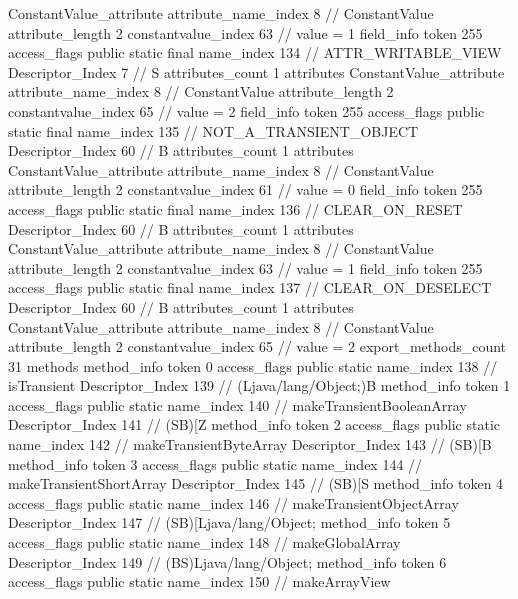 {{{{{{				ConstantValue_attribute {
					attribute_name_index	8		// ConstantValue
					attribute_length	2
					constantvalue_index	63		// value = 1
				}
				}
			}
			field_info {
				token	255
				access_flags	public static final
				name_index	134		// ATTR_WRITABLE_VIEW
				Descriptor_Index	7		// S
				attributes_count	1
				attributes {
				ConstantValue_attribute {
					attribute_name_index	8		// ConstantValue
					attribute_length	2
					constantvalue_index	65		// value = 2
				}
				}
			}
			field_info {
				token	255
				access_flags	public static final
				name_index	135		// NOT_A_TRANSIENT_OBJECT
				Descriptor_Index	60		// B
				attributes_count	1
				attributes {
				ConstantValue_attribute {
					attribute_name_index	8		// ConstantValue
					attribute_length	2
					constantvalue_index	61		// value = 0
				}
				}
			}
			field_info {
				token	255
				access_flags	public static final
				name_index	136		// CLEAR_ON_RESET
				Descriptor_Index	60		// B
				attributes_count	1
				attributes {
				ConstantValue_attribute {
					attribute_name_index	8		// ConstantValue
					attribute_length	2
					constantvalue_index	63		// value = 1
				}
				}
			}
			field_info {
				token	255
				access_flags	public static final
				name_index	137		// CLEAR_ON_DESELECT
				Descriptor_Index	60		// B
				attributes_count	1
				attributes {
				ConstantValue_attribute {
					attribute_name_index	8		// ConstantValue
					attribute_length	2
					constantvalue_index	65		// value = 2
				}
				}
			}
			}
			export_methods_count	31
			methods {
				method_info {
					token	0
					access_flags	public static
					name_index	138		// isTransient
					Descriptor_Index	139		// (Ljava/lang/Object;)B
				}
				method_info {
					token	1
					access_flags	public static
					name_index	140		// makeTransientBooleanArray
					Descriptor_Index	141		// (SB)[Z
				}
				method_info {
					token	2
					access_flags	public static
					name_index	142		// makeTransientByteArray
					Descriptor_Index	143		// (SB)[B
				}
				method_info {
					token	3
					access_flags	public static
					name_index	144		// makeTransientShortArray
					Descriptor_Index	145		// (SB)[S
				}
				method_info {
					token	4
					access_flags	public static
					name_index	146		// makeTransientObjectArray
					Descriptor_Index	147		// (SB)[Ljava/lang/Object;
				}
				method_info {
					token	5
					access_flags	public static
					name_index	148		// makeGlobalArray
					Descriptor_Index	149		// (BS)Ljava/lang/Object;
				}
				method_info {
					token	6
					access_flags	public static
					name_index	150		// makeArrayView
}}}}}
